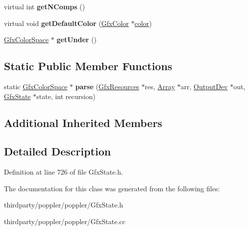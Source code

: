 \begin{DoxyCompactItemize}
\item 
\mbox{\label{class_gfx_pattern_color_space_ac97488be28b01f2085faaec704438f9a}} 
virtual int {\bfseries get\+N\+Comps} ()
\item 
\mbox{\label{class_gfx_pattern_color_space_a1a03a3d37e3a9aaf2c45a388376ca1a8}} 
virtual void {\bfseries get\+Default\+Color} (\hyperlink{struct_gfx_color}{Gfx\+Color} $\ast$\hyperlink{structcolor}{color})
\item 
\mbox{\label{class_gfx_pattern_color_space_a6c4c7f33a4549ac00152b77d88d3fffc}} 
\hyperlink{class_gfx_color_space}{Gfx\+Color\+Space} $\ast$ {\bfseries get\+Under} ()
\end{DoxyCompactItemize}
\subsection*{Static Public Member Functions}
\begin{DoxyCompactItemize}
\item 
\mbox{\label{class_gfx_pattern_color_space_ab69bd833777c5254678746cd2f848a8d}} 
static \hyperlink{class_gfx_color_space}{Gfx\+Color\+Space} $\ast$ {\bfseries parse} (\hyperlink{class_gfx_resources}{Gfx\+Resources} $\ast$res, \hyperlink{class_array}{Array} $\ast$arr, \hyperlink{class_output_dev}{Output\+Dev} $\ast$out, \hyperlink{class_gfx_state}{Gfx\+State} $\ast$state, int recursion)
\end{DoxyCompactItemize}
\subsection*{Additional Inherited Members}


\subsection{Detailed Description}


Definition at line 726 of file Gfx\+State.\+h.



The documentation for this class was generated from the following files\+:\begin{DoxyCompactItemize}
\item 
thirdparty/poppler/poppler/Gfx\+State.\+h\item 
thirdparty/poppler/poppler/Gfx\+State.\+cc\end{DoxyCompactItemize}
